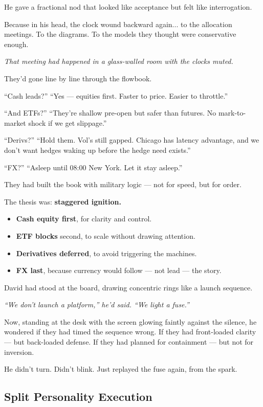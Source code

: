 He gave a fractional nod that looked like acceptance but felt like interrogation.

Because in his head, the clock wound backward again... to the allocation meetings.
To the diagrams.
To the models they thought were conservative enough.

\textit{That meeting had happened in a glass-walled room with the clocks muted.}

They’d gone line by line through the flowbook.

“Cash leads?”
“Yes — equities first. Faster to price. Easier to throttle.”

“And ETFs?”
“They’re shallow pre-open but safer than futures. No mark-to-market shock if we get slippage.”

“Derivs?”
“Hold them. Vol’s still gapped. Chicago has latency advantage, and we don’t want hedges waking up before the hedge need exists.”

“FX?”
“Asleep until 08:00 New York. Let it stay asleep.”

They had built the book with military logic — not for speed, but for order.

The thesis was: \textbf{staggered ignition.}

\begin{itemize}
\item \textbf{Cash equity first}, for clarity and control.
\item \textbf{ETF blocks} second, to scale without drawing attention.
\item \textbf{Derivatives deferred}, to avoid triggering the machines.
\item \textbf{FX last}, because currency would follow — not lead — the story.
\end{itemize}

David had stood at the board, drawing concentric rings like a launch sequence.

\textit{“We don’t launch a platform,” he’d said. “We light a fuse.”}

Now, standing at the desk with the screen glowing faintly against the silence,
he wondered if they had timed the sequence wrong.
If they had front-loaded clarity — but back-loaded defense.
If they had planned for containment — but not for inversion.

He didn’t turn.
Didn’t blink.
Just replayed the fuse again, from the spark.




\subsection{Split Personality Execution}

